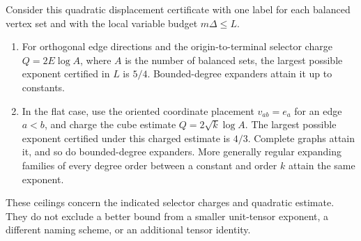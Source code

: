 \begin{proposition}\label{prop:accounting-optimal}
Consider this quadratic displacement certificate with one label for each balanced vertex set and with the local variable budget $m\Delta\leq L$.
\begin{enumerate}
\item For orthogonal edge directions and the origin-to-terminal selector charge $Q=2E\log A$, where $A$ is the number of balanced sets, the largest possible exponent certified in $L$ is $5/4$. Bounded-degree expanders attain it up to constants.
\item In the flat case, use the oriented coordinate placement $v_{ab}=e_a$ for an edge $a<b$, and charge the cube estimate $Q=2\sqrt{k}\log A$. The largest possible exponent certified under this charged estimate is $4/3$. Complete graphs attain it, and so do bounded-degree expanders. More generally regular expanding families of every degree order between a constant and order $k$ attain the same exponent.
\end{enumerate}
These ceilings concern the indicated selector charges and quadratic estimate. They do not exclude a better bound from a smaller unit-tensor exponent, a different naming scheme, or an additional tensor identity.
\end{proposition}
